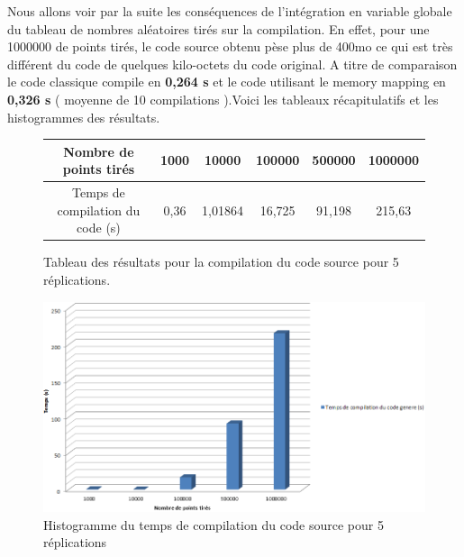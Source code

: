 \documentclass[a4paper,11pt]{report}
\begin{document}
\normalsize{
Nous allons voir par la suite les conséquences de l'intégration en variable globale du tableau de nombres aléatoires tirés sur la compilation. En effet, pour une 1000000 de points tirés, le code source obtenu pèse plus de 400mo ce qui est très différent du code de quelques kilo-octets du code original. A titre de comparaison le code classique compile en {\bf 0,264 s} et le code utilisant le memory mapping en {\bf 0,326 s} ( moyenne de 10 compilations  ).Voici les tableaux récapitulatifs et les histogrammes des résultats. \\
}
\begin{figure}[h]
\begin{center}
\begin{tabular}{|c|c|c|c|c|c|}
\hline
Nombre de points tirés & 1000 & 10000 & 100000 & 500000 & 1000000 \\
\hline
Temps de compilation du code (s) & 0,36 & 1,01864 & 16,725 & 91,198 & 215,63 \\
\hline
\end{tabular}
\end{center}
\caption{Tableau des résultats pour la compilation du code source pour 5 réplications.}
\end{figure}

\vspace{0.5cm}

\begin{figure}[!h]
   \begin{center}
   \includegraphics[scale = 0.65]{grapheCompilationCode5.PNG}
   \end{center}
  \caption{Histogramme du temps de compilation du code source pour 5 réplications}
\end{figure}

\vspace{0.5cm}
\end{document}
